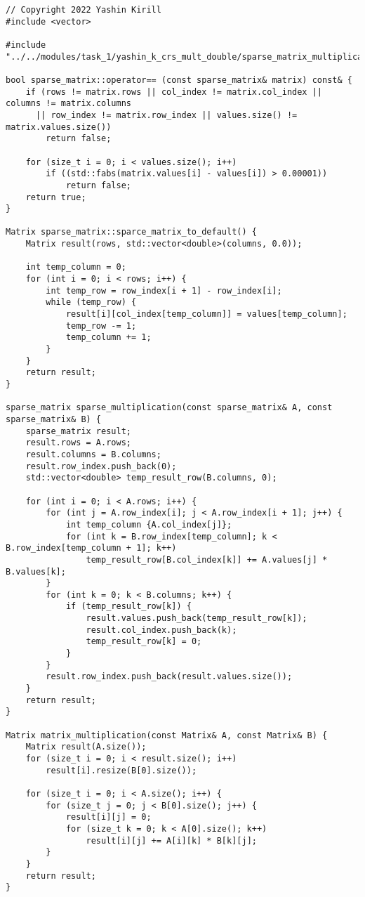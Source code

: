 \documentclass{report}
\begin{document}
\begin{lstlisting}
// Copyright 2022 Yashin Kirill
#include <vector>

#include "../../modules/task_1/yashin_k_crs_mult_double/sparse_matrix_multiplication_crs.h"

bool sparse_matrix::operator== (const sparse_matrix& matrix) const& {
    if (rows != matrix.rows || col_index != matrix.col_index || columns != matrix.columns
      || row_index != matrix.row_index || values.size() != matrix.values.size())
        return false;

    for (size_t i = 0; i < values.size(); i++)
        if ((std::fabs(matrix.values[i] - values[i]) > 0.00001))
            return false;
    return true;
}

Matrix sparse_matrix::sparce_matrix_to_default() {
    Matrix result(rows, std::vector<double>(columns, 0.0));

    int temp_column = 0;
    for (int i = 0; i < rows; i++) {
        int temp_row = row_index[i + 1] - row_index[i];
        while (temp_row) {
            result[i][col_index[temp_column]] = values[temp_column];
            temp_row -= 1;
            temp_column += 1;
        }
    }
    return result;
}

sparse_matrix sparse_multiplication(const sparse_matrix& A, const sparse_matrix& B) {
    sparse_matrix result;
    result.rows = A.rows;
    result.columns = B.columns;
    result.row_index.push_back(0);
    std::vector<double> temp_result_row(B.columns, 0);

    for (int i = 0; i < A.rows; i++) {
        for (int j = A.row_index[i]; j < A.row_index[i + 1]; j++) {
            int temp_column {A.col_index[j]};
            for (int k = B.row_index[temp_column]; k < B.row_index[temp_column + 1]; k++)
                temp_result_row[B.col_index[k]] += A.values[j] * B.values[k];
        }
        for (int k = 0; k < B.columns; k++) {
            if (temp_result_row[k]) {
                result.values.push_back(temp_result_row[k]);
                result.col_index.push_back(k);
                temp_result_row[k] = 0;
            }
        }
        result.row_index.push_back(result.values.size());
    }
    return result;
}

Matrix matrix_multiplication(const Matrix& A, const Matrix& B) {
    Matrix result(A.size());
    for (size_t i = 0; i < result.size(); i++)
        result[i].resize(B[0].size());

    for (size_t i = 0; i < A.size(); i++) {
        for (size_t j = 0; j < B[0].size(); j++) {
            result[i][j] = 0;
            for (size_t k = 0; k < A[0].size(); k++)
                result[i][j] += A[i][k] * B[k][j];
        }
    }
    return result;
}


\end{lstlisting}
\end{document}

